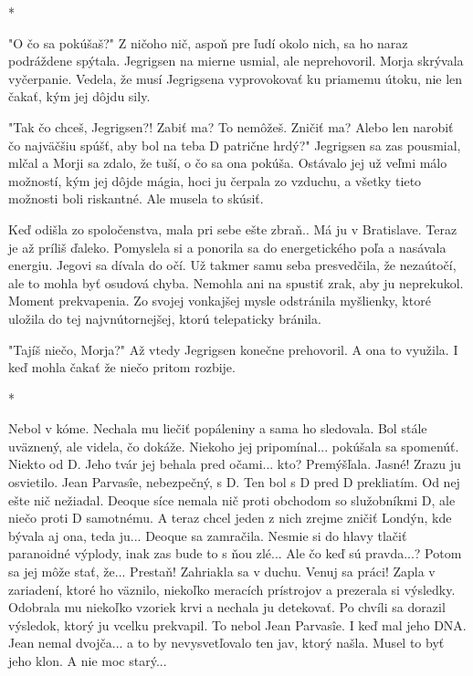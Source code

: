 \documentclass{book}
\begin{document}
\begin{center}

*

\end{center}

 "$ $O čo sa pokúšaš?"$ $ Z ničoho nič, aspoň pre ľudí okolo nich, sa ho naraz podráždene spýtala. Jegrigsen na mierne usmial, ale neprehovoril. Morja skrývala vyčerpanie. Vedela, že musí Jegrigsena vyprovokovať ku priamemu útoku, nie len čakať, kým jej dôjdu sily.

"$ $Tak čo chceš, Jegrigsen?! Zabiť ma? To nemôžeš. Zničiť ma? Alebo len narobiť čo najväčšiu spúšť, aby bol na teba D patrične hrdý?"$ $ Jegrigsen sa zas pousmial, mlčal a Morji sa zdalo, že tuší, o čo sa ona pokúša. Ostávalo jej už veľmi málo možností, kým jej dôjde mágia, hoci ju čerpala zo vzduchu, a všetky tieto možnosti boli riskantné. Ale musela to skúsiť.

Keď odišla zo spoločenstva, mala pri sebe ešte zbraň.. Má ju v Bratislave. Teraz je až príliš ďaleko. Pomyslela si a ponorila sa do energetického poľa a nasávala energiu. Jegovi sa dívala do očí. Už takmer samu seba presvedčila, že nezaútočí, ale to mohla byť osudová chyba. Nemohla ani na spustiť zrak, aby ju neprekukol. Moment prekvapenia. Zo svojej vonkajšej mysle odstránila myšlienky, ktoré uložila do tej najvnútornejšej, ktorú telepaticky bránila.

"$ $Tajíš niečo, Morja?"$ $ Až vtedy Jegrigsen konečne prehovoril. A ona to využila. I keď mohla čakať že niečo pritom rozbije.

\begin{center}

*

\end{center}

Nebol v kóme. Nechala mu liečiť popáleniny a sama ho sledovala. Bol stále uväznený, ale videla, čo dokáže. Niekoho jej pripomínal... pokúšala sa spomenúť. Niekto od D. Jeho tvár jej behala pred očami... kto? Premýšľala. Jasné! Zrazu ju osvietilo. Jean Parvasîe, nebezpečný, s D. Ten bol s D pred D prekliatím. Od nej ešte nič nežiadal. Deoque síce nemala nič proti obchodom so služobníkmi D, ale niečo proti D samotnému. A teraz chcel jeden z nich zrejme zničiť Londýn, kde bývala aj ona, teda ju... Deoque sa zamračila. Nesmie si do hlavy tlačiť paranoidné výplody, inak zas bude to s ňou zlé... Ale čo keď sú pravda...? Potom sa jej môže stať, že... Prestaň! Zahriakla sa v duchu. Venuj sa práci! Zapla v zariadení, ktoré ho väznilo, niekoľko meracích prístrojov a prezerala si výsledky. Odobrala mu niekoľko vzoriek krvi a nechala ju detekovať. Po chvíli sa dorazil výsledok, ktorý ju vcelku prekvapil. To nebol Jean Parvasîe. I keď mal jeho DNA. Jean nemal dvojča... a to by nevysvetľovalo ten jav, ktorý našla. Musel to byť jeho klon. A nie moc starý...
\end{document}
